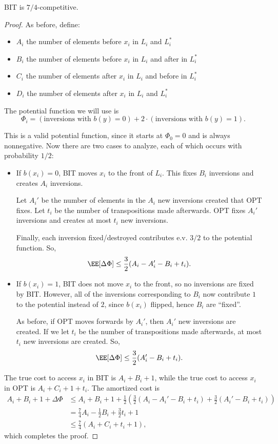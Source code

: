 \begin{theorem}
\thmlabel

BIT is $7/4$-competitive.
\end{theorem}

\begin{proof}

As before, define:
\begin{itemize}
    \item $A_i$ the number of elements before $x_i$ in $L_i$ and $L_i^*$
    \item $B_i$ the number of elements before $x_i$ in $L_i$ and after in $L_i^*$
    \item $C_i$ the number of elements after $x_i$ in $L_i$ and before in $L_i^*$
    \item $D_i$ the number of elements after $x_i$ in $L_i$ and $L_i^*$
\end{itemize}

The potential function we will use is 
\[\Phi_i = (\text{inversions with }b(y)=0) + 2\cdot (\text{inversions with }b(y)=1).\]

This is a valid potential function, since it starts at $\Phi_0=0$ and is always nonnegative. Now there are two cases to analyze, each of which occurs with probability $1/2$: 
\begin{itemize}
    \item If $b(x_i)=0$, BIT moves $x_i$ to the front of $L_i$. This fixes $B_i$ inversions and creates $A_i$ inversions. 
    
    Let $A_i'$ be the number of elements in the $A_i$ new inversions created that OPT fixes. Let $t_i$ be the number of transpositions made afterwards. OPT fixes $A_i'$ inversions and creates at most $t_i$ new inversions. 

    Finally, each inversion fixed/destroyed contributes e.v. $3/2$ to the potential function. So,
    \[\EE[\Delta \Phi] \leq \frac{3}{2}(A_i-A_i'-B_i+t_i).\]
    \item If $b(x_i)=1$, BIT does not move $x_i$ to the front, so no inversions are fixed by BIT. However, all of the inversions corresponding to $B_i$ now contribute $1$ to the potential instead of $2$, since $b(x_i)$ flipped, hence $B_i$ are ``fixed''. 

    As before, if OPT moves forwards by $A_i'$, then $A_i'$ new inversions are created. If we let $t_i$ be the number of transpositions made afterwards, at most $t_i$ new inversions are created. So,
    \[\EE[\Delta \Phi] \leq \frac{3}{2}(A_i'-B_i+t_i).\]
\end{itemize}

The true cost to access $x_i$ in BIT is $A_i+B_i+1$, while the true cost to access $x_i$ in OPT is $A_i+C_i+1+t_i$. The amortized cost is 
\begin{align*}
    A_i+B_i+1+\Delta \Phi &\leq A_i+B_i+1+\frac{1}{2}\left(\frac{3}{2}(A_i-A_i'-B_i+t_i) + \frac{3}{2}(A_i'-B_i+t_i)\right) \\
    &= \frac{7}{4}A_i - \frac{1}{2}B_i + \frac{3}{2}t_i+1 \\
    &\leq \frac{7}{4}(A_i+C_i+t_i+1),
\end{align*}
which completes the proof.

\end{proof}

